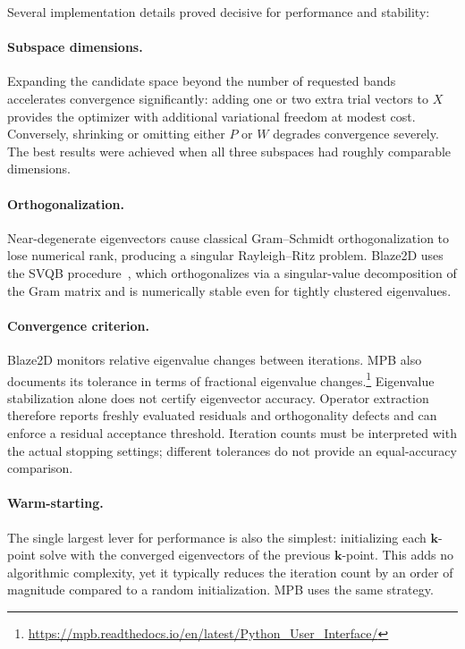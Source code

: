Several implementation details proved decisive for performance and
stability:

\paragraph{Subspace dimensions.}
Expanding the candidate space beyond the number of requested bands
accelerates convergence significantly: adding one or two extra trial
vectors to $X$ provides the optimizer with additional variational
freedom at modest cost. Conversely, shrinking or omitting either $P$
or $W$ degrades convergence severely. The best results were achieved
when all three subspaces had roughly comparable dimensions.

\paragraph{Orthogonalization.}
Near-degenerate eigenvectors cause classical Gram--Schmidt
orthogonalization to lose numerical rank, producing a singular
Rayleigh--Ritz problem. Blaze2D uses the SVQB procedure~\cite{stathopoulos2002},
which orthogonalizes via a singular-value decomposition of the Gram
matrix and is numerically stable even for tightly clustered
eigenvalues.

\paragraph{Convergence criterion.}
Blaze2D monitors relative eigenvalue changes between iterations. MPB
also documents its tolerance in terms of fractional eigenvalue changes.\footnote{\url{https://mpb.readthedocs.io/en/latest/Python_User_Interface/}}
Eigenvalue stabilization alone does not certify eigenvector accuracy.
Operator extraction therefore reports freshly evaluated residuals and
orthogonality defects and can enforce a residual acceptance threshold.
Iteration counts must be interpreted with the actual stopping settings;
different tolerances do not provide an equal-accuracy comparison.

\paragraph{Warm-starting.}
The single largest lever for performance is also the simplest:
initializing each $\bm{k}$-point solve with the converged eigenvectors
of the previous $\bm{k}$-point. This adds no algorithmic complexity,
yet it typically reduces the iteration count by an order of magnitude
compared to a random initialization. MPB uses the same strategy.

